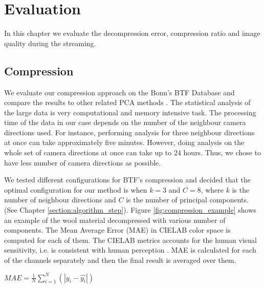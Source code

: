\chapter{Evaluation}
\label{chapter:Evaluation}
In this chapter we evaluate the decompression error, compression ratio and image quality during the streaming.


\section{Compression}
\label{section:eval_compression}



We evaluate our compression approach on the Bonn's BTF Database \cite{btfBonn} and compare the results to other related PCA methods \cite{haindl}.
The statistical analysis of the large data is very computational and memory intensive task.
The processing time of the data in our case depends on the number of the neighbour camera directions used.
For instance, performing analysis for three neighbour directions at once can take approximately five minutes.
However, doing analysis on the whole set of camera directions at once can take up to 24 hours.
Thus, we chose to have less number of camera directions as possible.


We tested different configurations for BTF's compression and decided that the optimal configuration for our method is when $k=3$ and $C=8$, where $k$ is the number of neighbour directions and $C$ is the number of principal components. (See Chapter \ref{section:algorithm_step}).
Figure \ref{fig:compression_example} shows an example of the wool material decompressed with various number of components. The Mean Average Error (MAE) in CIELAB color space is computed for each of them.
The CIELAB metrics accounts for the human visual sensitivity, i.e. is consistent with human perception \cite{cielab}.
MAE is calculated for each of the channels separately and then the final result is averaged over them.

{\centering $MAE = \frac{1}{N}\sum_{i=1}^{N}(\left | y_i-\hat{y_i} \right |)$\\}

